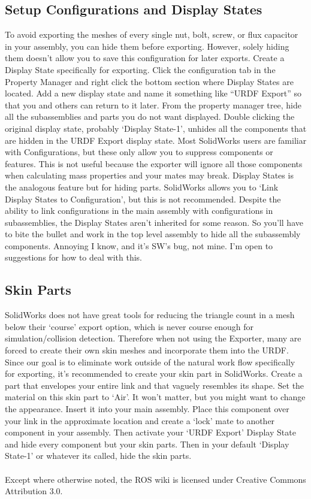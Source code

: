 \subsection{Setup Configurations and Display States}
To avoid exporting the meshes of every single nut, bolt, screw, or flux capacitor in your assembly, you can hide them before exporting. However, solely hiding them doesn't allow you to save this configuration for later exports. 
Create a Display State specifically for exporting. Click the configuration tab in the Property Manager and right click the bottom section where Display States are located. Add a new display state and name it something like ``URDF Export'' so that you and others can return to it later. From the property manager tree, hide all the subassemblies and parts you do not want displayed. Double clicking the original display state, probably `Display State-1', unhides all the components that are hidden in the URDF Export display state. 
Most SolidWorks users are familiar with Configurations, but these only allow you to suppress components or features. This is not useful because the exporter will ignore all those components when calculating mass properties and your mates may break. Display States is the analogous feature but for hiding parts. 
SolidWorks allows you to `Link Display States to Configuration', but this is not recommended. Despite the ability to link configurations in the main assembly with configurations in subassemblies, the Display States aren't inherited for some reason. So you'll have to bite the bullet and work in the top level assembly to hide all the subassembly components. Annoying I know, and it's SW's bug, not mine. I'm open to suggestions for how to deal with this. 

\subsection{Skin Parts}
SolidWorks does not have great tools for reducing the triangle count in a mesh below their `course' export option, which is never course enough for simulation/collision detection. Therefore when not using the Exporter, many are forced to create their own skin meshes and incorporate them into the URDF. Since our goal is to eliminate work outside of the natural work flow specifically for exporting, it's recommended to create your skin part in SolidWorks. 
Create a part that envelopes your entire link and that vaguely resembles its shape. Set the material on this skin part to `Air'. It won't matter, but you might want to change the appearance. Insert it into your main assembly. Place this component over your link in the approximate location and create a `lock' mate to another component in your assembly. Then activate your `URDF Export' Display State and hide every component but your skin parts. Then in your default `Display State-1' or whatever its called, hide the skin parts. 
\\
\\
Except where otherwise noted, the ROS wiki is licensed under Creative Commons Attribution 3.0.
